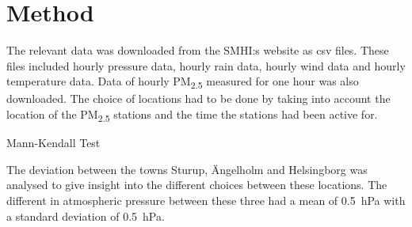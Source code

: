\newpage
\section{Method}
The relevant data was downloaded from the SMHI:s website as csv files. These files included hourly pressure data, hourly rain data, hourly wind data and hourly temperature data. Data of hourly PM\textsubscript{2.5} measured for one hour was also downloaded. The choice of locations had to be done by taking into account the location of the PM\textsubscript{2.5} stations and the time the stations had been active for.  

Mann-Kendall Test 

The deviation between the towns Sturup, Ängelholm and Helsingborg was analysed to give insight into the different choices between these locations. The different in atmospheric pressure between these three had a mean of \SI{0.5}{\hecto\pascal} with a standard deviation of \SI{0.5}{\hecto\pascal}. 

